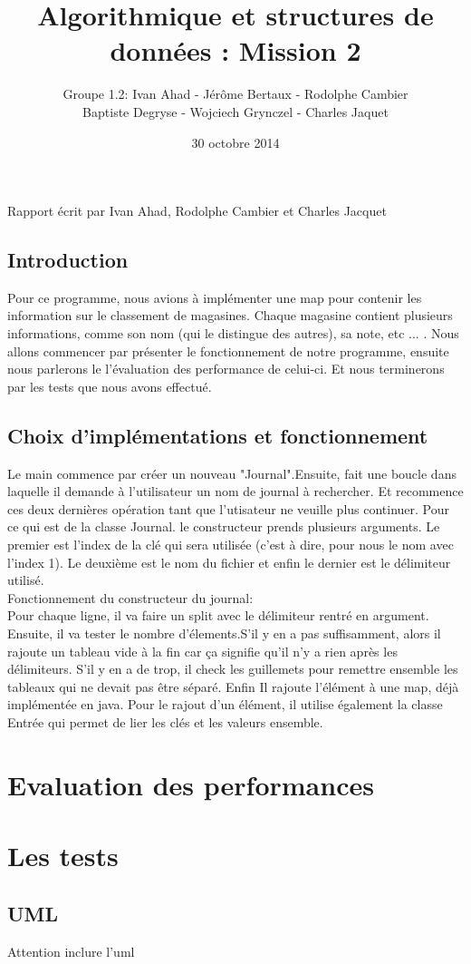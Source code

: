 \documentclass[a4paper]{article}
\title{Algorithmique et structures de données : Mission 2}
\date{30 octobre 2014}
\author{Groupe 1.2: Ivan Ahad - Jérôme Bertaux - Rodolphe Cambier \\ 
	Baptiste Degryse - Wojciech Grynczel - Charles Jaquet}
\begin{document}
\maketitle



Rapport écrit par Ivan Ahad, Rodolphe Cambier et Charles Jacquet

\subsection*{Introduction}
Pour ce programme, nous avions à implémenter une map pour contenir les information sur le classement de magasines. Chaque magasine contient plusieurs informations, comme son nom (qui le distingue des autres), sa note, etc ... .
Nous allons commencer par présenter le fonctionnement de notre programme, ensuite nous parlerons le l'évaluation des performance de celui-ci. Et nous terminerons par les tests que nous avons effectué.

\subsection*{Choix d'implémentations et fonctionnement}
Le main commence par créer un nouveau "Journal".Ensuite, fait une boucle dans laquelle il demande à l'utilisateur un nom de journal à rechercher.
Et recommence ces deux dernières opération tant que l'utisateur ne veuille plus continuer.
Pour ce qui est de la classe Journal. le constructeur prends plusieurs arguments. Le premier est l'index de la clé qui sera utilisée (c'est à dire, pour nous le nom avec l'index 1). Le deuxième est le nom du fichier et enfin le dernier est le délimiteur utilisé.\\
Fonctionnement du constructeur du journal:\\
Pour chaque ligne, il va faire un split avec le délimiteur rentré en argument. Ensuite, il va tester le nombre d'élements.S'il y en a pas suffisamment, alors il rajoute un tableau vide à la fin car ça signifie qu'il n'y a rien après les délimiteurs. S'il y en a de trop, il check les guillemets pour remettre ensemble les tableaux qui ne devait pas être séparé. Enfin Il rajoute l'élément à une map, déjà implémentée en java. Pour le rajout d'un élément, il utilise également la classe Entrée qui permet de lier les clés et les valeurs ensemble.

\section*{Evaluation des performances}

\section*{Les tests}



\subsection*{UML}
Attention inclure l'uml
\end{document}
